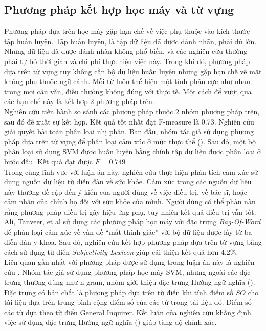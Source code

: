 \subsection{Phương pháp kết hợp học máy và từ vựng}
Phương pháp dựa trên học máy gặp hạn chế về việc phụ thuộc vào kích thước tập huấn luyện. Tập huấn luyện, là tập dữ liệu đã được đánh nhãn, phải đủ lớn. Nhưng dữ liệu đã được đánh nhãn không phổ biến, và các nghiên cứu thường phải tự bỏ thời gian và chi phí thực hiện việc này. Trong khi đó, phương pháp dựa trên từ vựng tuy không cần bộ dữ liệu huấn luyện nhưng gặp hạn chế về mặt không phụ thuộc ngữ cảnh. Mỗi từ luôn thể hiện một tính phân cực như nhau trong mọi câu văn, điều thường không đúng với thực tế. Một cách để vượt qua các hạn chế này là kết hợp 2 phương pháp trên.\\

Nghiên cứu \cite{gonccalves2013comparing} tiến hành so sánh các phương pháp thuộc 2 nhóm phương pháp trên, sau đó đề xuất sự kết hợp. Kết quả tốt nhất đạt F-measure là 0.73. Nghiên cứu \cite{Zhang2011} giải quyết bài toán phân loại nhị phân. Ban đầu, nhóm tác giả sử dụng phương pháp dựa trên từ vựng để phân loại cảm xúc ở mức thực thể (). Sau đó, một bộ phân loại sử dụng SVM được huấn luyện bằng chính tập dữ liệu được phân loại ở bước đầu. Kết quả đạt được $F = 0.749$\\

Trong cùng lĩnh vực với luận án này, nghiên cứu \cite{ali2013can} thực hiện phân tích cảm xúc sử dụng nguồn dữ liệu từ diễn đàn về sức khỏe. Cảm xúc trong các nguồn dữ liệu này thường đề cập đến ý kiến của người dùng về việc điều trị, về bác sĩ, hoặc cảm nhận của chính họ đối với sức khỏe của mình. Người dùng có thể phàn nàn rằng phương pháp điều trị gây hiệu ứng phụ, tuy nhiên kết quả điều trị vẫn tốt. Ali, Tanveer, et al \cite{ali2013can} sử dụng các phương pháp học máy với đặc trưng \textit{Bag-Of-Word} để phân loại cảm xúc về vấn đề ``mất thính giác'' với bộ dữ liệu được lấy từ ba diễn đàn y khoa\footnotemark. Sau đó, nghiên cứu kết hợp phương pháp dựa trên từ vựng bằng cách sử dụng từ điển \textit{Subjectivity Lexicon} giúp cải thiện kết quả hơn 4.2\%. \\

Liên quan gần nhất với phương pháp được sử dụng trong luận án này là nghiên cứu \cite{sarker2011outcome}. Nhóm tác giả sử dụng phương pháp học máy SVM, nhưng ngoài các đặc trưng thường dùng như n-gram, nhóm giới thiệu đặc trưng Hướng ngữ nghĩa (). Đặc trưng có bản chất là phương pháp dựa trên từ điển khi tính điểm số $SO$ cho tài liệu dựa trên trung bình cộng điểm số của các từ trong tài liệu đó. Điểm số các từ dựa theo từ điển General Inquirer. Kết luận của nghiên cứu khẳng định việc sử dụng đặc trưng Hướng ngữ nghĩa () giúp tăng độ chính xác.